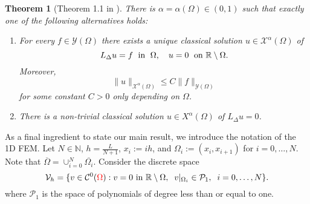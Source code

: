 \documentclass[10 pt]{article}
\newtheorem{theorem}{Theorem}[section]
\numberwithin{equation}{section}
\def\R{\mathbb{R}}
\newcommand{\B}[1]{{\color{red} #1}}  %
\begin{document}
\begin{theorem}[Theorem 1.1 in \cite{CS22}]\label{eq:regularity}
    There is $\alpha=\alpha(\Omega)\in(0,1)$ such that exactly one of the following alternatives holds:
    \begin{enumerate}[label=\roman*)]
        \item For every $f\in\mathcal Y(\Omega)$ there exists a unique classical solution $u\in\mathcal X^{\alpha}(\Omega)$ of
        \begin{equation}\label{eq:log_problem}
            L_{\Delta} u = f \;\textnormal{ in }\; \Omega, \quad u=0 \;\textnormal{ on } \R\setminus \Omega.
        \end{equation}
        Moreover,
        \begin{equation}\label{eq:regularity_classical}
            \|u\|_{\mathcal X^{\alpha}(\Omega)}\leq C\|f\|_{\mathcal Y(\Omega)}
        \end{equation}
        for some constant $C>0$ only depending on $\Omega$.
        \item There is a non-trivial classical solution $u\in X^{\alpha}(\Omega)$ of $L_{\Delta} u=0$.
    \end{enumerate}
\end{theorem}

As a final ingredient to state our main result, we introduce the notation of the 1D FEM.  Let $N\in\mathbb N$, $h=\frac{L}{N+1}$, $x_i:=ih$, and $\Omega_i:=(x_{i},x_{i+1})$ for $i=0,\ldots,N$. Note that $\overline{\Omega}=\cup_{i=0}^N \overline{\Omega_i}$. Consider the discrete space
%
\begin{equation}
    \mathcal V_h=\{v\in \mathcal C^0(\B{\Omega}): v=0 \textnormal{ in } \R\setminus \Omega, \;\; v|_{\Omega_i}\in \mathcal P_1, \;\;  i=0,\ldots,N\}.
\end{equation}
%
where $\mathcal P_1$ is the space of polynomials of degree less than or equal to one.
\end{document}
